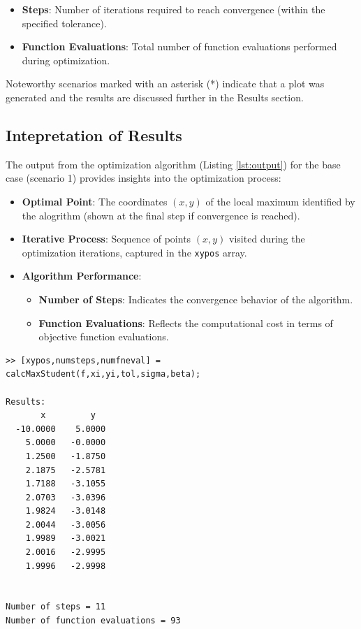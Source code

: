 \documentclass{article}
\newcommand{\mat}[1]{\lstinline[style=matlabstyle]|#1|}
\begin{document}
\begin{itemize}
    \item \textbf{Steps}: Number of iterations required to reach convergence (within the specified tolerance).
    \item \textbf{Function Evaluations}: Total number of function evaluations performed during optimization.
\end{itemize}

Noteworthy scenarios marked with an asterisk (*) indicate that a plot was generated and the results are discussed further in the Results section.

\pagebreak

\subsection{Intepretation of Results}
The output from the optimization algorithm (Listing \ref{lst:output}) for the base case (scenario 1) provides insights into the optimization process:

\begin{itemize}
    \item \textbf{Optimal Point}: The coordinates $(x,y)$ of the local maximum identified by the alogrithm (shown at the final step if convergence is reached).
    \item \textbf{Iterative Process}: Sequence of points $(x,y)$ visited during the optimization iterations, captured in the \mat{xypos} array.
    \item \textbf{Algorithm Performance}:
        \begin{itemize}
            \item \textbf{Number of Steps}: Indicates the convergence behavior of the algorithm.
            \item \textbf{Function Evaluations}: Reflects the computational cost in terms of objective function evaluations.
        \end{itemize}
\end{itemize}

\pagebreak

\begin{lstlisting}[style=matlabstyle, caption = {Optimization Algorithm Output},numbers=none, label={lst:output}]
>> [xypos,numsteps,numfneval] = calcMaxStudent(f,xi,yi,tol,sigma,beta);

Results:
       x         y
  -10.0000    5.0000
    5.0000   -0.0000
    1.2500   -1.8750
    2.1875   -2.5781
    1.7188   -3.1055
    2.0703   -3.0396
    1.9824   -3.0148
    2.0044   -3.0056
    1.9989   -3.0021
    2.0016   -2.9995
    1.9996   -2.9998


Number of steps = 11
Number of function evaluations = 93
\end{lstlisting}
\end{document}
